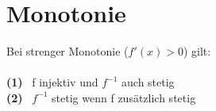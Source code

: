 \documentclass[a4paper,12pt]{article} %
\begin{document}
\section{Monotonie}
\begin{center}
\end{center}
Bei strenger Monotonie ($f'(x) > 0$) gilt:\\
\\
\textbf{(1)} \ f injektiv und $f^{-1}$ auch stetig\\
\textbf{(2)} \ $f^{-1}$ stetig wenn f zusätzlich stetig
\end{document}
